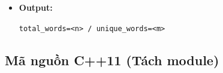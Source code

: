 \begin{itemize}
\begin{itemize}
            \item \textbf{Module 4 (Ghi file):}
            \begin{itemize}
                \item Hàm \texttt{writeOutput(path, total\_words, unique\_words)}
            \end{itemize}
        \end{itemize}

        \item \textbf{Output:}
        \begin{center}
        \texttt{total\_words=<n> / unique\_words=<m>}
        \end{center}
    \end{itemize}

\subsection{Mã nguồn C++11 (Tách module)}
